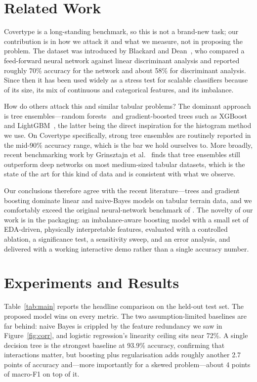 \documentclass[sigconf,nonacm]{acmart}
\begin{document}
\section{Related Work}
\label{sec:related}
Covertype is a long-standing benchmark, so this is not a brand-new task; our
contribution is in how we attack it and what we measure, not in proposing the
problem. The dataset was introduced by Blackard and Dean~\cite{blackard1999},
who compared a feed-forward neural network against linear discriminant analysis
and reported roughly 70\% accuracy for the network and about 58\% for
discriminant analysis. Since then it has been used widely as a stress test for
scalable classifiers because of its size, its mix of continuous and categorical
features, and its imbalance.

How do others attack this and similar tabular problems? The dominant approach is
tree ensembles---random forests~\cite{breiman2001} and gradient-boosted trees
such as XGBoost~\cite{chen2016} and LightGBM~\cite{ke2017}, the latter being the
direct inspiration for the histogram method we use. On Covertype specifically,
strong tree ensembles are routinely reported in the mid-90\% accuracy range,
which is the bar we hold ourselves to. More broadly, recent benchmarking work by
Grinsztajn et al.~\cite{grinsztajn2022} finds that tree ensembles still
outperform deep networks on most medium-sized tabular datasets, which is the
state of the art for this kind of data and is consistent with what we observe.

Our conclusions therefore agree with the recent literature---trees and
gradient boosting dominate linear and naive-Bayes models on tabular terrain
data, and we comfortably exceed the original neural-network benchmark of
\cite{blackard1999}. The novelty of our work is in the packaging: an
imbalance-aware boosting model with a small set of EDA-driven, physically
interpretable features, evaluated with a controlled ablation, a significance
test, a sensitivity sweep, and an error analysis, and delivered with a working
interactive demo rather than a single accuracy number.

\section{Experiments and Results}
\label{sec:results}
Table~\ref{tab:main} reports the headline comparison on the held-out test set.
The proposed model wins on every metric. The two assumption-limited baselines are
far behind: naive Bayes is crippled by the feature redundancy we saw in
Figure~\ref{fig:corr}, and logistic regression's linearity ceiling sits near 72\%.
A single decision tree is the strongest baseline at 93.9\% accuracy, confirming
that interactions matter, but boosting plus regularisation adds roughly another
2.7 points of accuracy and---more importantly for a skewed problem---about 4
points of macro-F1 on top of it.
\end{document}
